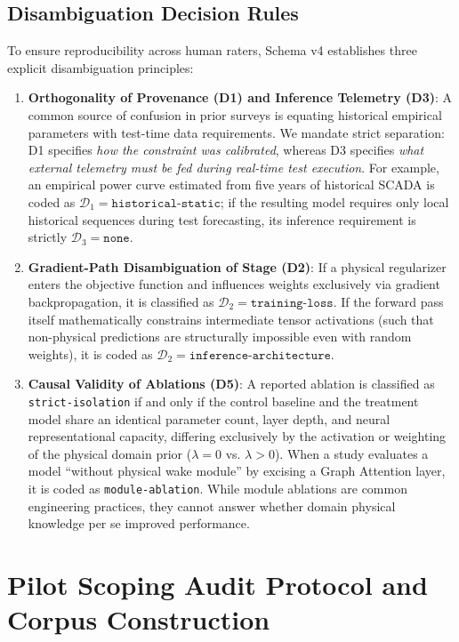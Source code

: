 \documentclass[preprint,3p,times]{elsarticle}
\begin{document}
\subsection{Disambiguation Decision Rules}
To ensure reproducibility across human raters, Schema v4 establishes three explicit disambiguation principles:
\begin{enumerate}
    \item \textbf{Orthogonality of Provenance (D1) and Inference Telemetry (D3)}: A common source of confusion in prior surveys is equating historical empirical parameters with test-time data requirements. We mandate strict separation: D1 specifies \textit{how the constraint was calibrated}, whereas D3 specifies \textit{what external telemetry must be fed during real-time test execution}. For example, an empirical power curve estimated from five years of historical SCADA is coded as $\mathcal{D}_1 = \texttt{historical-static}$; if the resulting model requires only local historical sequences during test forecasting, its inference requirement is strictly $\mathcal{D}_3 = \texttt{none}$.
    \item \textbf{Gradient-Path Disambiguation of Stage (D2)}: If a physical regularizer enters the objective function and influences weights exclusively via gradient backpropagation, it is classified as $\mathcal{D}_2 = \texttt{training-loss}$. If the forward pass itself mathematically constrains intermediate tensor activations (such that non-physical predictions are structurally impossible even with random weights), it is coded as $\mathcal{D}_2 = \texttt{inference-architecture}$.
    \item \textbf{Causal Validity of Ablations (D5)}: A reported ablation is classified as \texttt{strict-isolation} if and only if the control baseline and the treatment model share an identical parameter count, layer depth, and neural representational capacity, differing exclusively by the activation or weighting of the physical domain prior ($\lambda=0$ vs. $\lambda > 0$). When a study evaluates a model ``without physical wake module'' by excising a Graph Attention layer, it is coded as \texttt{module-ablation}. While module ablations are common engineering practices, they cannot answer whether domain physical knowledge per se improved performance.
\end{enumerate}

\section{Pilot Scoping Audit Protocol and Corpus Construction}
\label{sec:protocol}
\end{document}
